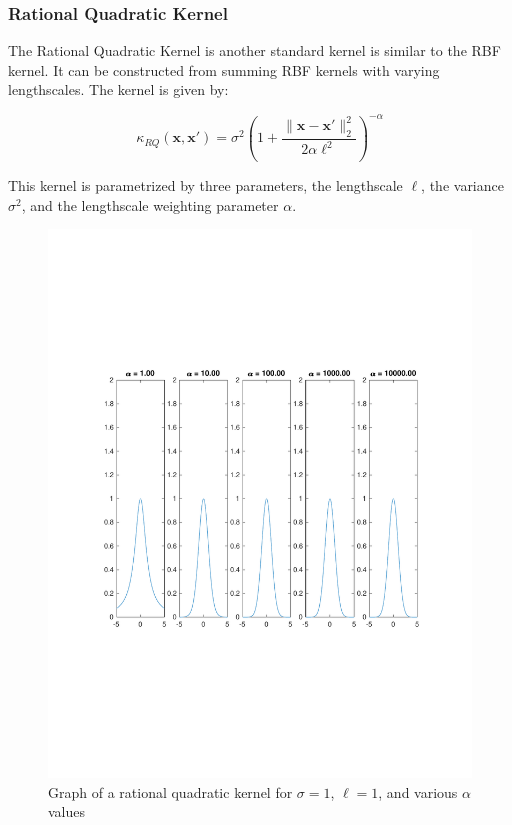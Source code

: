 \documentclass{article}
\newcommand{\bx}{\boldsymbol{x}}
\begin{document}
\subsubsection{Rational Quadratic Kernel}

The Rational Quadratic Kernel is another standard kernel is similar to the RBF kernel. It can be constructed from
summing RBF kernels with varying lengthscales. The kernel is given by:

\[
  \kappa_{RQ}(\bx, \bx') = \sigma^2 \left( 1 + \frac{\| \bx - \bx' \|_{2}^{2}}{2 \alpha \ell^2} \right)^{-\alpha}
\]

This kernel is parametrized by three parameters, the lengthscale $\ell$, the variance $\sigma^2$, and the lengthscale
weighting parameter $\alpha$\cite{duvenaud_automatic_2014}.

\begin{figure}[H] \label{fig:rqk}
  \caption{Graph of a rational quadratic kernel for $\sigma = 1$, $\ell = 1$, and various $\alpha$ values}
  \includegraphics[width=\textwidth]{rqk}
\end{figure}
\end{document}

